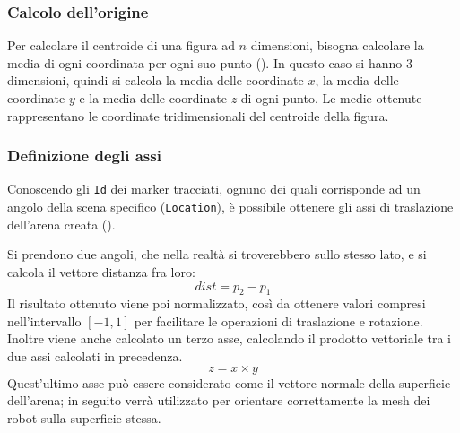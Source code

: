 \documentclass[12pt,a4paper,openright,oneside]{book}
\begin{document}
\subsubsection{Calcolo dell'origine}\label{sec:calcolo_dell_origine} %
Per calcolare il centroide di una figura ad $n$ dimensioni, bisogna calcolare la media di ogni coordinata per ogni suo punto (). In questo caso si hanno $3$ dimensioni, quindi si calcola la media delle coordinate $x$, la media delle coordinate $y$ e la media delle coordinate $z$ di ogni punto. Le medie ottenute rappresentano le coordinate tridimensionali del centroide della figura.
%

%
%
\subsubsection{Definizione degli assi}\label{sec:definizione_degli_assi} %
Conoscendo gli \texttt{Id} dei marker tracciati, ognuno dei quali corrisponde ad un angolo della scena specifico (\texttt{Location}), è possibile ottenere gli assi di traslazione dell'arena creata ().

Si prendono due angoli, che nella realtà si troverebbero sullo stesso lato, e si calcola il vettore distanza fra loro:
\[
    dist = p_2 - p_1
\]
Il risultato ottenuto viene poi normalizzato, così da ottenere valori compresi nell'intervallo $\left[-1, 1\right]$ per facilitare le operazioni di traslazione e rotazione.
Inoltre viene anche calcolato un terzo asse, calcolando il prodotto vettoriale tra i due assi calcolati in precedenza.
\[
    z = x \times y
\]
Quest'ultimo asse può essere considerato come il vettore normale della superficie dell'arena; in seguito verrà utilizzato per orientare correttamente la mesh dei robot sulla superficie stessa.
%
%
%
\end{document}
